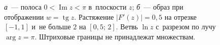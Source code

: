 \documentclass{article}
\begin{document}
\begin{figure}[h]
  \centering
  \ifdim\linewidth<469.75pt\resizebox{\linewidth}{!}{\rule{469.75pt}{120pt}}\else\rule{469.75pt}{120pt}\fi
  \caption{\textit{а}~--- полоса $0<\operatorname{Im} z<\pi$ в~плоскости $z$; \textit{б}~--- образ при отображении $w=\operatorname{tg} z$. Растяжение $|F'(z)|=0{,}5$ на отрезке $[-1,1]$ и~не больше $2$ на $[0{,}5;\,2]$. Ветвь $\ln z$ с~разрезом по лучу $\arg z=\pi$. Штриховые границы не принадлежат множествам.}
\end{figure}
\end{document}
